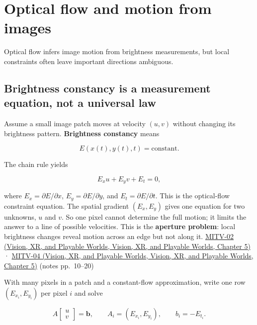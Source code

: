 \section{Optical flow and motion from images}\label{04-visual-computing-ii-ch030-optical-flow-and-motion-from-images}

Optical flow infers image motion from brightness measurements, but local constraints often leave important directions ambiguous.

\subsection{Brightness constancy is a measurement equation, not a universal law}\label{04-visual-computing-ii-ch030-brightness-constancy-is-a-measurement-equation-not-a-universal-law}

Assume a small image patch moves at velocity \((u,v)\) without changing its brightness pattern. \textbf{Brightness constancy} means

\[
E(x(t),y(t),t)=\text{constant}.
\]

The chain rule yields

\[
E_xu+E_yv+E_t=0,
\]

where \(E_x=\partial E/\partial x\), \(E_y=\partial E/\partial y\), and \(E_t=\partial E/\partial t\). This is the optical-flow constraint equation. The spatial gradient \((E_x,E_y)\) gives one equation for two unknowns, \(u\) and \(v\). So one pixel cannot determine the full motion; it limits the answer to a line of possible velocities. This is the \textbf{aperture problem}: local brightness changes reveal motion across an edge but not along it. \href{../07-Vision-XR-and-Playable-Worlds/main.pdf\#nameddest=04-visual-computing-ii-ch036-mitv-02---image-formation-perspective-projection-time-derivative-motion-field}{MITV-02 (Vision, XR, and Playable Worlds, Vision, XR, and Playable Worlds, Chapter 5)} · \href{../07-Vision-XR-and-Playable-Worlds/main.pdf\#nameddest=04-visual-computing-ii-ch036-mitv-04---fixed-optical-flow-optical-mouse-constant-brightness-assumption-closed-form-solution}{MITV-04 (Vision, XR, and Playable Worlds, Vision, XR, and Playable Worlds, Chapter 5)} (notes pp.~10--20)

With many pixels in a patch and a constant-flow approximation, write one row \((E_{x_i},E_{y_i})\) per pixel \(i\) and solve

\[
A\begin{bmatrix}u\\v\end{bmatrix}=\mathbf{b},\qquad A_i=(E_{x_i},E_{y_i}),\qquad b_i=-E_{t_i}.
\]

